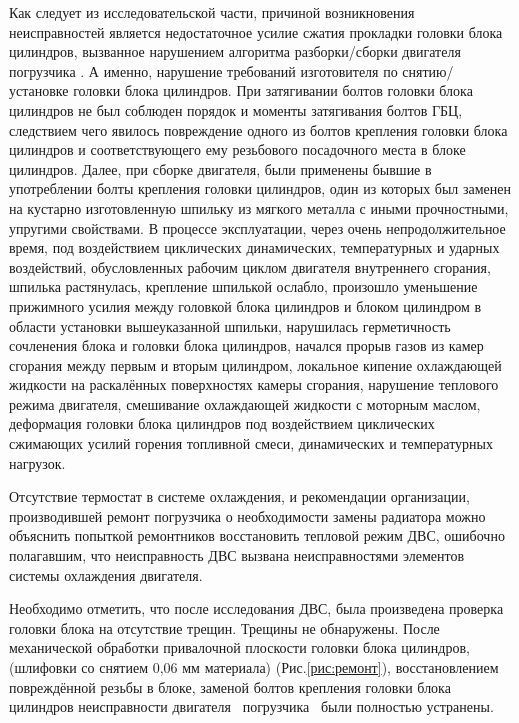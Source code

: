 Как следует из исследовательской части, причиной возникновения неисправностей является недостаточное усилие сжатия прокладки головки блока цилиндров, вызванное  нарушением алгоритма разборки/сборки двигателя \, погрузчика . А именно, нарушение требований изготовителя по снятию/установке головки блока цилиндров.   При затягивании болтов головки блока цилиндров не был соблюден порядок и моменты затягивания болтов ГБЦ, следствием чего явилось повреждение одного из болтов крепления головки блока цилиндров и соответствующего ему резьбового посадочного места в блоке цилиндров. Далее, при сборке двигателя, были применены бывшие в употреблении болты крепления головки цилиндров, один из которых был заменен на кустарно изготовленную шпильку из мягкого металла с иными прочностными, упругими свойствами.  В процессе эксплуатации, через очень непродолжительное время, под воздействием циклических динамических, температурных и ударных воздействий,  обусловленных рабочим циклом двигателя внутреннего сгорания, шпилька растянулась, крепление шпилькой ослабло, произошло уменьшение прижимного усилия между головкой блока цилиндров и блоком цилиндром в области установки вышеуказанной шпильки, нарушилась герметичность сочленения блока и головки блока цилиндров, начался прорыв газов из камер сгорания между первым и вторым цилиндром, локальное кипение охлаждающей жидкости на раскалённых поверхностях камеры сгорания, нарушение теплового режима двигателя, смешивание охлаждающей жидкости с моторным маслом, деформация головки блока цилиндров под воздействием циклических сжимающих усилий  горения топливной смеси, динамических и температурных нагрузок. 

Отсутствие термостат  в системе охлаждения, и рекомендации организации, производившей ремонт погрузчика о необходимости замены радиатора можно объяснить попыткой ремонтников  восстановить тепловой режим ДВС, ошибочно полагавшим, что неисправность ДВС вызвана неисправностями элементов системы охлаждения двигателя.

Необходимо отметить, что после исследования ДВС,  была произведена проверка головки блока на отсутствие трещин.  Трещины не обнаружены. После механической обработки привалочной плоскости головки блока цилиндров, (шлифовки со снятием 0,06 мм материала) (Рис.\ref{рис:ремонт}), восстановлением повреждённой резьбы в блоке, заменой болтов крепления головки блока цилиндров неисправности двигателя \, погрузчика \, были полностью устранены. 




